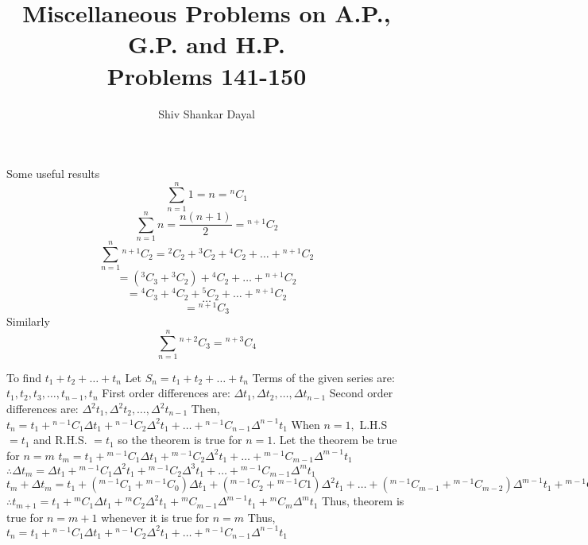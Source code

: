 \documentclass[aspectratio=1610,8pt]{beamer}
\title{Miscellaneous Problems on A.P., G.P. and H.P.\\Problems 141-150}
\author[Shiv Shankar Dayal]{Shiv Shankar Dayal}
\begin{document}
\begin{frame}
  \titlepage
\end{frame}
\begin{frame}{Some useful results}
  $$\sum_{n = 1}^n1 = n = {}^nC_1$$
  $$\sum_{n = 1}^nn = \frac{n(n + 1)}{2} = {}^{n + 1}C_2$$
  $$\sum_{n = 1}^n{}^{n + 1}C_2 = {}^2C_2 + {}^3C_2 + {}^4C_2 + \ldots +{}^{n + 1}C_2$$
  $$= ({}^3C_3 + {}^3C_2) + {}^4C_2 + \ldots +{}^{n + 1}C_2$$
  $$= {}^4C_3 + {}^4C_2 + {}^5C_2 + \ldots +{}^{n + 1}C_2$$
  $$\ldots$$
  $$= {}^{n + 1}C_3$$
  Similarly $$\sum_{n = 1}^n{}^{n + 2}C_3 = {}^{n + 3}C_4$$
\end{frame}
\begin{frame}{To find $t_1 + t_2 + \ldots + t_n$}
  Let $S_n = t_1 + t_2 + \ldots + t_n$
  \linebreak\linebreak
  Terms of the given series are: $t_1, t_2, t_3, \ldots, t_{n - 1}, t_n$
  \linebreak\linebreak
  First order differences are: $\Delta t_1, \Delta t_2, \ldots, \Delta t_{n - 1}$
  \linebreak\linebreak
  Second order differences are: $\Delta^2t_1, \Delta^2t_2, \ldots, \Delta^2t_{n - 1}$
  \linebreak\linebreak
  Then, $t_n = t_1 + {}^{n - 1}C_1\Delta t_1 + {}^{n - 1}C_2\Delta^2t_1+ \ldots + {}^{n - 1}C_{n - 1}\Delta^{n - 1}t_1$
  \linebreak\linebreak
  When $n =1,$ L.H.S $= t_1$ and R.H.S. $= t_1$ so the theorem is true for $n = 1.$ Let the theorem be true for $n = m$
  \linebreak\linebreak
  $t_m = t_1 + {}^{m - 1}C_1\Delta t_1 + {}^{m - 1}C_2\Delta^2t_1 + \ldots + {}^{m - 1}C_{m - 1}\Delta^{m - 1}t_1$
  \linebreak\linebreak
  $\therefore \Delta t_m = \Delta t_1 + {}^{m - 1}C_1\Delta^2 t_1 + {}^{m - 1}C_2\Delta^3t_1 + \ldots + {}^{m - 1}C_{m -
    1}\Delta^mt_1$
  \linebreak\linebreak
  $t_m + \Delta t_m = t_1 + ({}^{m - 1}C_1 + {}^{m - 1}C_0)\Delta t_1 + ({}^{m - 1}C_2 + {}^{m - 1}C1)\Delta^2t_1 + \ldots + ({}^{m
    - 1}C_{m - 1} + {}^{m - 1}C_{m - 2})\Delta^{m - 1}t_1 + {}^{m - 1}C_{m - 1}\Delta^mt_1$
  \linebreak\linebreak
  $\therefore t_{m + 1} = t_1 + {}^mC_1\Delta t_1 + {}^mC_2\Delta^2 t_1 + {}^mC_{m - 1}\Delta^{m - 1}t_1 + {}^mC_m\Delta^mt_1$
  \linebreak\linebreak
  Thus, theorem is true for $n = m + 1$ whenever it is true for $n = m$
  \linebreak\linebreak
  Thus, $t_n = t_1 + {}^{n - 1}C_1\Delta t_1 + {}^{n - 1}C_2\Delta^2t_1 + \ldots + {}^{n - 1}C_{n - 1}\Delta^{n - 1}t_1$
\end{frame}
\end{document}

